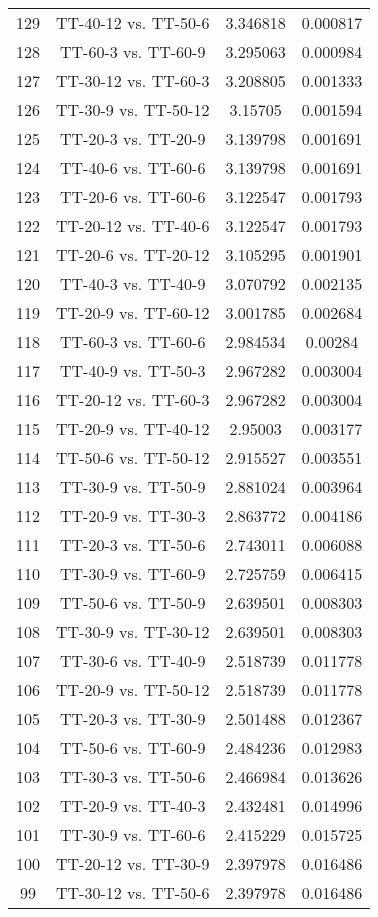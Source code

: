\documentclass[a4paper,10pt]{article}
\begin{document}
\begin{landscape}
\begin{table}[!htp]
\begin{tabular}{cccc}
129&TT-40-12 vs. TT-50-6&3.346818&0.000817\\
128&TT-60-3 vs. TT-60-9&3.295063&0.000984\\
127&TT-30-12 vs. TT-60-3&3.208805&0.001333\\
126&TT-30-9 vs. TT-50-12&3.15705&0.001594\\
125&TT-20-3 vs. TT-20-9&3.139798&0.001691\\
124&TT-40-6 vs. TT-60-6&3.139798&0.001691\\
123&TT-20-6 vs. TT-60-6&3.122547&0.001793\\
122&TT-20-12 vs. TT-40-6&3.122547&0.001793\\
121&TT-20-6 vs. TT-20-12&3.105295&0.001901\\
120&TT-40-3 vs. TT-40-9&3.070792&0.002135\\
119&TT-20-9 vs. TT-60-12&3.001785&0.002684\\
118&TT-60-3 vs. TT-60-6&2.984534&0.00284\\
117&TT-40-9 vs. TT-50-3&2.967282&0.003004\\
116&TT-20-12 vs. TT-60-3&2.967282&0.003004\\
115&TT-20-9 vs. TT-40-12&2.95003&0.003177\\
114&TT-50-6 vs. TT-50-12&2.915527&0.003551\\
113&TT-30-9 vs. TT-50-9&2.881024&0.003964\\
112&TT-20-9 vs. TT-30-3&2.863772&0.004186\\
111&TT-20-3 vs. TT-50-6&2.743011&0.006088\\
110&TT-30-9 vs. TT-60-9&2.725759&0.006415\\
109&TT-50-6 vs. TT-50-9&2.639501&0.008303\\
108&TT-30-9 vs. TT-30-12&2.639501&0.008303\\
107&TT-30-6 vs. TT-40-9&2.518739&0.011778\\
106&TT-20-9 vs. TT-50-12&2.518739&0.011778\\
105&TT-20-3 vs. TT-30-9&2.501488&0.012367\\
104&TT-50-6 vs. TT-60-9&2.484236&0.012983\\
103&TT-30-3 vs. TT-50-6&2.466984&0.013626\\
102&TT-20-9 vs. TT-40-3&2.432481&0.014996\\
101&TT-30-9 vs. TT-60-6&2.415229&0.015725\\
100&TT-20-12 vs. TT-30-9&2.397978&0.016486\\
99&TT-30-12 vs. TT-50-6&2.397978&0.016486\\

\end{tabular}
\end{table}
\end{landscape}
\end{document}
